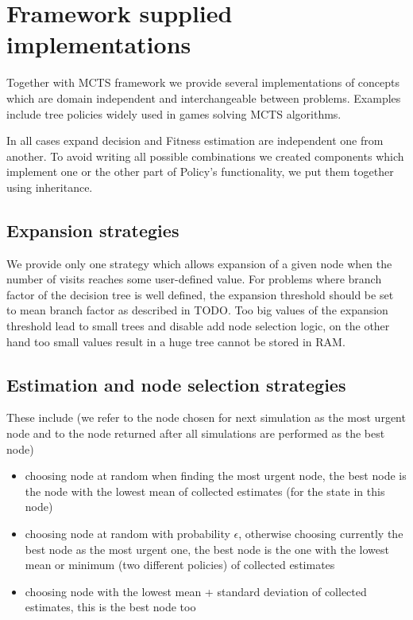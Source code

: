 \section{Framework supplied implementations}

Together with MCTS framework we provide several implementations of concepts
which are domain independent and interchangeable between problems. Examples
include tree policies widely used in games solving MCTS algorithms.

In all cases expand decision and Fitness estimation are independent one from
another. To avoid writing all possible combinations we created components which
implement one or the other part of Policy's functionality, we put them together
using inheritance.

\subsection{Expansion strategies}

We provide only one strategy which allows expansion of a given node when the
number of visits reaches some user-defined value. For problems where branch
factor of the decision tree is well defined, the expansion threshold should be
set to mean branch factor as described in TODO. %
Too big values of the expansion threshold lead to small trees and disable add
node selection logic, on the other hand too small values result in a huge tree
cannot be stored in RAM.

\subsection{Estimation and node selection strategies}

These include (we refer to the node chosen for next simulation as the most
urgent node and to the node returned after all simulations are performed as the
best node)
\begin{itemize}
  \item choosing node at random when finding the most urgent node, the best
    node is the node with the lowest mean of collected estimates (for the state
    in this node)
  \item choosing node at random with probability $\epsilon$, otherwise choosing
    currently the best node as the most urgent one, the best node is the one
    with the lowest mean or minimum (two different policies) of collected
    estimates
  \item choosing node with the lowest mean + standard deviation of collected
    estimates, this is the best node too
\end{itemize}

